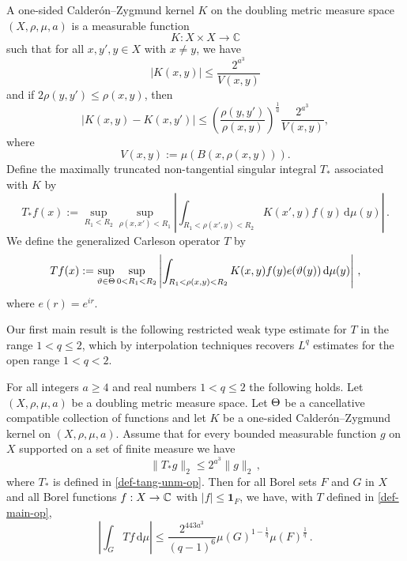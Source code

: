A one-sided Calder\'on--Zygmund kernel $K$ on the doubling metric measure space $(X, \rho, \mu, a)$ is a measurable function
\begin{equation}\label{eqkernel0}
  K:X\times X\to \mathbb{C}
\end{equation}
such that for all $x,y',y\in X$ with $x\neq y$, we have
\begin{equation}\label{eqkernel-size}
    |K(x,y)| \leq \frac{2^{a^3}}{V(x,y)}
\end{equation}
and if $2\rho(y,y') \leq \rho(x,y)$, then
\begin{equation}
  \label{eqkernel-y-smooth}
  |K(x,y) - K(x,y')| \leq \left(\frac{\rho(y,y')}{\rho(x,y)}\right)^{\frac{1}{a}}\frac{2^{a^3}}{V(x,y)},
\end{equation}
where \[V(x,y):=\mu(B(x,\rho(x,y))).\]
Define the maximally truncated non-tangential singular integral $T_{*}$ associated with $K$ by
\begin{equation}
    \label{def-tang-unm-op}
    T_{*}f(x):=\sup_{R_1 < R_2} \sup_{\rho(x,x')<R_1} \left|\int_{R_1< \rho(x',y) < R_2} K(x',y) f(y) \, \mathrm{d}\mu(y) \right|\,.
\end{equation}
We define the generalized Carleson operator $T$ by
\begin{equation}
    \label{def-main-op}
    Tf(x):=\sup_{{\vartheta}\in{\Theta}} \sup_{0 < R_1 < R_2}\left| \int_{R_1 < \rho(x,y) < R_2} K(x,y) f(y) e({\vartheta}(y)) \, \mathrm{d}\mu(y) \right|\, ,
\end{equation}
where $e(r)=e^{ir}$.

Our first main result is the following restricted weak type estimate for $T$ in the range $1<q\le 2$,
which by interpolation techniques recovers $L^q$ estimates for the open range $1<q<2$.
\begin{theorem}
\label{metric-space-Carleson}
\leanok
{}
    For all integers $a \ge 4$ and real numbers $1<q\le 2$ the following holds.
    Let $(X,\rho,\mu,a)$ be a doubling metric measure space.
    Let ${\Theta}$ be a cancellative compatible collection of functions and let $K$ be a one-sided Calder\'on--Zygmund kernel on $(X,\rho,\mu,a)$.
    Assume that for every bounded measurable function $g$ on $X$ supported on a set of finite measure we have
    \begin{equation}\label{nontanbound}
        \|T_{*}g\|_{2} \leq 2^{a^3} \|g\|_2\,,
    \end{equation}
    where $T_{*}$ is defined in \eqref{def-tang-unm-op}.
    Then for all Borel sets $F$ and $G$ in $X$ and all Borel functions $f:X\to \mathbb{C}$ with
    $|f|\le \mathbf{1}_F$, we have, with $T$ defined in \eqref{def-main-op},
    \begin{equation}
        \label{resweak}
        \left|\int_{G} T f \, \mathrm{d}\mu\right| \leq \frac{2^{443a^3}}{(q-1)^6} \mu(G)^{1-\frac{1}{q}} \mu(F)^{\frac{1}{q}}\, .
    \end{equation}
\end{theorem}

